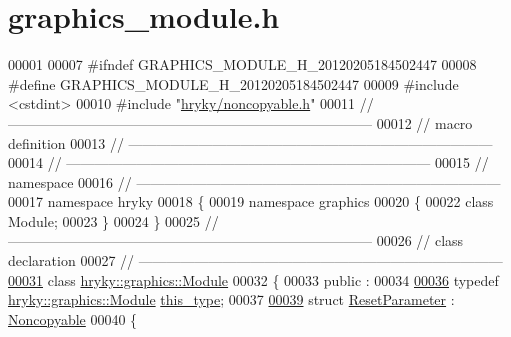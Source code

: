 \hypertarget{graphics__module_8h_source}{\section{graphics\-\_\-module.\-h}
}

\begin{DoxyCode}
00001 
00007 \textcolor{preprocessor}{#ifndef GRAPHICS\_MODULE\_H\_20120205184502447}
00008 \textcolor{preprocessor}{}\textcolor{preprocessor}{#define GRAPHICS\_MODULE\_H\_20120205184502447}
00009 \textcolor{preprocessor}{}\textcolor{preprocessor}{#include <cstdint>}
00010 \textcolor{preprocessor}{#include "\hyperlink{noncopyable_8h}{hryky/noncopyable.h}"}
00011 \textcolor{comment}{//
      ------------------------------------------------------------------------------}
00012 \textcolor{comment}{// macro definition}
00013 \textcolor{comment}{//
      ------------------------------------------------------------------------------}
00014 \textcolor{comment}{//
      ------------------------------------------------------------------------------}
00015 \textcolor{comment}{// namespace}
00016 \textcolor{comment}{//
      ------------------------------------------------------------------------------}
00017 \textcolor{keyword}{namespace }hryky
00018 \{
00019 \textcolor{keyword}{namespace }graphics
00020 \{
00022     \textcolor{keyword}{class }Module;
00023 \}
00024 \}
00025 \textcolor{comment}{//
      ------------------------------------------------------------------------------}
00026 \textcolor{comment}{// class declaration}
00027 \textcolor{comment}{//
      ------------------------------------------------------------------------------}
\hypertarget{graphics__module_8h_source_l00031}{}\hyperlink{classhryky_1_1graphics_1_1_module}{00031} \textcolor{comment}{}\textcolor{keyword}{class }\hyperlink{classhryky_1_1graphics_1_1_module}{hryky::graphics::Module}
00032 \{
00033 \textcolor{keyword}{public} :
00034 
\hypertarget{graphics__module_8h_source_l00036}{}\hyperlink{classhryky_1_1graphics_1_1_module_a7145b30601df820c888b3e8d90326568}{00036}     \textcolor{keyword}{typedef} \hyperlink{classhryky_1_1graphics_1_1_module}{hryky::graphics::Module} \hyperlink{classhryky_1_1graphics_1_1_module_a7145b30601df820c888b3e8d90326568}{this_type};
00037 
\hypertarget{graphics__module_8h_source_l00039}{}\hyperlink{structhryky_1_1graphics_1_1_module_1_1_reset_parameter}{00039}     \textcolor{keyword}{struct }\hyperlink{structhryky_1_1graphics_1_1_module_1_1_reset_parameter}{ResetParameter} : \hyperlink{classhryky_1_1_noncopyable}{Noncopyable}
00040     \{

\end{DoxyCode}
